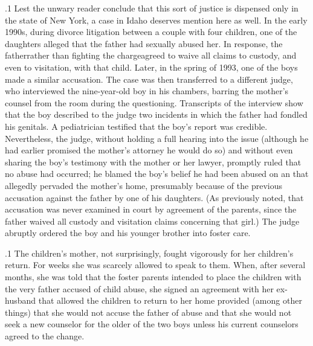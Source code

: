 \documentclass[11pt, twoside]{article}
\begin{document}
{\p.1{%
Lest the unwary reader conclude that this sort of justice is dispensed
only in the state of New York, a case in Idaho deserves mention
here as well. In the early 1990s, during divorce litigation between
a couple with four children, one of the daughters alleged that the father
had sexually abused her. In response, the father\mdash{}rather than fighting
the charge\mdash{}agreed to waive all claims to custody, and even to visitation, with that child. Later, in the spring of 1993, one of the boys
made a similar accusation. The case was then transferred to a different judge, who interviewed the nine-year-old boy in his chambers,
barring the mother’s counsel from the room during the questioning.
Transcripts of the interview show that the boy described to the judge
two incidents in which the father had fondled his genitals. A pediatrician testified that the boy’s report was credible. Nevertheless, the judge,
without holding a full hearing into the issue (although he had earlier promised the mother’s attorney he would do so) and without even
sharing the boy’s testimony with the mother or her lawyer, promptly
ruled that no abuse had occurred; he blamed the boy’s belief he had
been abused on an  that allegedly pervaded the
mother’s home, presumably because of the previous accusation against
the father by one of his daughters. (As previously noted, that accusation was never examined in court by agreement of the parents, since
the father waived all custody and visitation claims concerning that
girl.) The judge abruptly ordered the boy and his younger brother into
foster care.
}%

\p.1{%
The children’s mother, not surprisingly, fought vigorously for her
children’s return. For weeks she was scarcely allowed to speak to them.
When, after several months, she was told that the foster parents intended
to place the children  with the very father accused of child
abuse, she signed an agreement with her ex-husband that allowed the
children to return to her home provided (among other things) that she
would not accuse the father of abuse and that she would not seek a new
counselor for the older of the two boys unless his current counselors
agreed to the change.
}%

}
\end{document}
